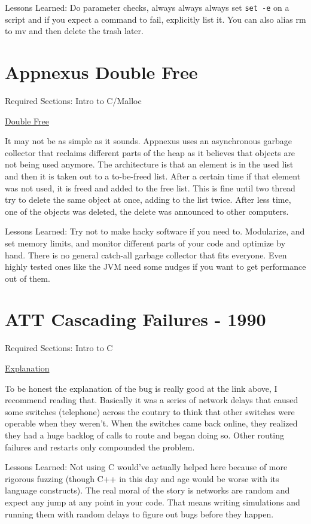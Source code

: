 Lessons Learned: Do parameter checks, always always always set \texttt{set -e} on a script and if you expect a command to fail, explicitly list it. You can also alias rm to mv and then delete the trash later.

\section{Appnexus Double Free}

Required Sections: Intro to C/Malloc

\href{https://techblog.appnexus.com/2013-09-17-outage-postmortem-586b19ae4307}{Double Free}

It may not be as simple as it sounds. Appnexus uses an asynchronous garbage collector that reclaims different parts of the heap as it believes that objects are not being used anymore. The architecture is that an element is in the used list and then it is taken out to a to-be-freed list. After a certain time if that element was not used, it is freed and added to the free list. This is fine until two thread try to delete the same object at once, adding to the list twice. After less time, one of the objects was deleted, the delete was announced to other computers.

Lessons Learned: Try not to make hacky software if you need to. Modularize, and set memory limits, and monitor different parts of your code and optimize by hand. There is no general catch-all garbage collector that fits everyone. Even highly tested ones like the JVM need some nudges if you want to get performance out of them.

\section{ATT Cascading Failures - 1990}

Required Sections: Intro to C

\href{http://users.csc.calpoly.edu/~jdalbey/SWE/Papers/att_collapse.html}{Explanation}

To be honest the explanation of the bug is really good at the link above, I recommend reading that. Basically it was a series of network delays that caused some switches (telephone) across the coutnry to think that other switches were operable when they weren't. When the switches came back online, they realized they had a huge backlog of calls to route and began doing so. Other routing failures and restarts only compounded the problem.

Lessons Learned: Not using C would've actually helped here because of more rigorous fuzzing (though C++ in this day and age would be worse with its language constructs). The real moral of the story is networks are random and expect any jump at any point in your code. That means writing simulations and running them with random delays to figure out bugs before they happen.

